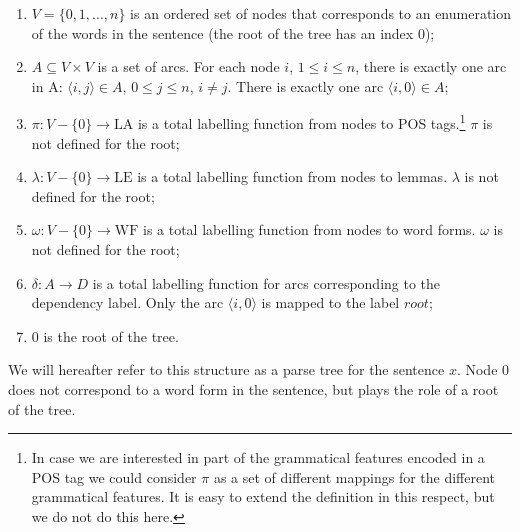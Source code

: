 \documentclass[output=paper,colorlinks,citecolor=brown]{langscibook}
\begin{document}
\begin{enumerate}
\item $V=\{0,1,...,n\}$ is an ordered set of nodes that corresponds to an enumeration of the words in the sentence (the root of the tree has an index 0);

\item $A \subseteq V \times V$ is a set of arcs. For each node $i$, $1 \leq i \leq n$, there is exactly one arc in A: $\langle i, j \rangle \in A$, $0 \leq j \leq n$, $i \neq j$. There is exactly one arc $\langle i, 0 \rangle \in A$;

\item $\pi : V - \{ 0 \} \rightarrow \text{LA}$ is a total labelling function from nodes to POS tags.\footnote{In case we are interested in part of the grammatical features encoded in a POS tag we could consider $\pi$ as a set of different mappings for the different grammatical features. It is easy to extend the definition in this respect, but we do not do this here.} $\pi$ is not defined for the root;

\item $\lambda : V - \{ 0 \} \rightarrow \text{LE}$ is a total labelling function from nodes to lemmas. $\lambda$ is not defined for the root;

\item $\omega : V - \{ 0 \} \rightarrow \text{WF}$ is a total labelling function from nodes to word forms. $\omega$ is not defined for the root;

\item $\delta : A \rightarrow D$ is a total labelling function for arcs corresponding to the dependency label. Only the arc $\langle i, 0 \rangle$ is mapped to the label $root$;

\item $0$ is the root of the tree.

\end{enumerate}

We will hereafter refer to this structure as a parse tree for the sentence  $x$. Node 0 does not correspond to a word form in the sentence, but plays the role of a root of the tree.
\end{document}
